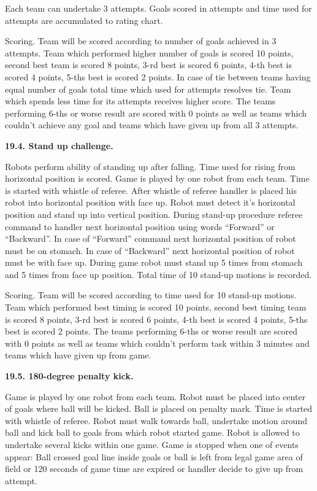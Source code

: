 \documentclass[a4paper]{article}
\begin{document}
Each team can undertake 3 attempts. Goals scored in attempts and time used for attempts are accumulated to rating chart.


Scoring. Team will be scored according to number of goals achieved in 3 attempts. Team which performed higher number of
goals is scored 10 points, second best team is scored 8 points, 3-rd best is scored 6 points, 4-th best is scored 4
points, 5-ths best is scored 2 points. In case of tie between teams having equal number of goals total time which used
for attempts resolves tie. Team which spends less time for its attempts receives higher score. The teams performing
6-ths or worse result are scored with 0 points as well as teams which couldn\textgreek{’}t achieve any goal and teams
which have given up from all 3 attempts.

\textbf{19.4. Stand up challenge.}

Robots perform ability of standing up after falling. Time used for rising from horizontal position is scored. Game is
played by one robot from each team. Time is started with whistle of referee. After whistle of referee handler is placed
his robot into horizontal position with face up. Robot must detect it\textgreek{’}s horizontal position and stand up
into vertical position. During stand-up procedure referee command to handler next horizontal position using words
“Forward” or “Backward”. In case of “Forward” command next horizontal position of robot must be on stomach. In case of
“Backward” next horizontal position of robot must be with face up. During game robot must stand up 5 times from stomach
and 5 times from face up position. Total time of 10 stand-up motions is recorded. 

Scoring. Team will be scored according to time used for 10 stand-up motions. Team which performed best timing is scored
10 points, second best timing team is scored 8 points, 3-rd best is scored 6 points, 4-th best is scored 4 points,
5-ths best is scored 2 points. The teams performing 6-ths or worse result are scored with 0 points as well as teams
which couldn\textgreek{’}t perform task within 3 minutes and teams which have given up from game. \ 

\textbf{19.5. 180-degree penalty kick.}

Game is played by one robot from each team. Robot must be placed into center of goals where ball will be kicked. Ball is
placed on penalty mark. Time is started with whistle of referee. Robot must walk towards ball, undertake motion around
ball and kick ball to goals from which robot started game. Robot is allowed to undertake several kicks within one game.
Game is stopped when one of events appear: Ball crossed goal line inside goals or ball is left from legal game area of
field or 120 seconds of game time are expired or handler decide to give up from attempt.
\end{document}
